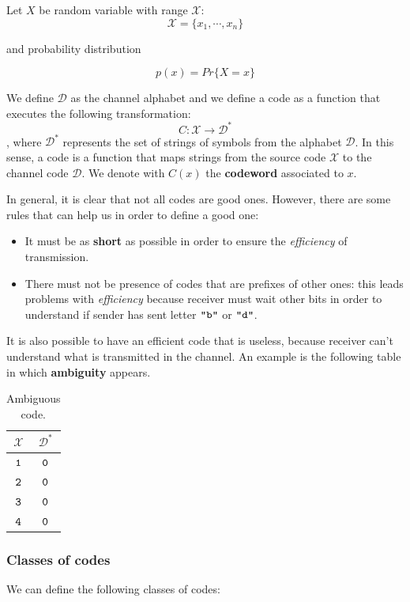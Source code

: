 Let $X$ be random variable with range $\mathcal{X}$:
$$\mathcal{X} = \{x_1, \cdots, x_n\}$$

and probability distribution

$$p(x) = Pr\{X=x\}$$

We define $\mathcal{D}$ as the channel alphabet and we define a code as a function that executes the following transformation:
$$C : \mathcal{X} \rightarrow \mathcal{D}^*$$
, where $\mathcal{D}^*$ represents the set of strings of symbols from the alphabet $\mathcal{D}$. In this sense, a code is a function that maps strings from the source code $\mathcal{X}$ to the channel code $\mathcal{D}$. We denote with $C(x)$ the \textbf{codeword} associated to $x$.

In general, it is clear that not all codes are good ones. However, there are some rules that can help us in order to define a good one:
\begin{itemize}
	\item It must be as \textbf{short} as possible in order to ensure the \textit{efficiency} of transmission.
	\item There must not be presence of codes that are prefixes of other ones: this leads problems with \textit{efficiency} because receiver must wait other bits in order to understand if sender has sent letter $\verb|"b"|$ or $\verb|"d"|$.
\end{itemize}  
It is also possible to have an efficient code that is useless, because receiver can't understand what is transmitted in the channel. An example is the following table in which \textbf{ambiguity} appears.
\begin{table}[H]
	\centering
	\begin{tabular}{| c | c |}
		\hline
		$\mathcal{X}$ & $\mathcal{D}^*$\\\hline
		$\verb|1|$ & $\verb|0|$ \\
		$\verb|2|$ & $\verb|0|$ \\
		$\verb|3|$ & $\verb|0|$ \\
		$\verb|4|$ & $\verb|0|$ \\
		\hline
	\end{tabular}
	\caption{Ambiguous code.}
\end{table}

\subsubsection{Classes of codes}
We can define the following classes of codes:


